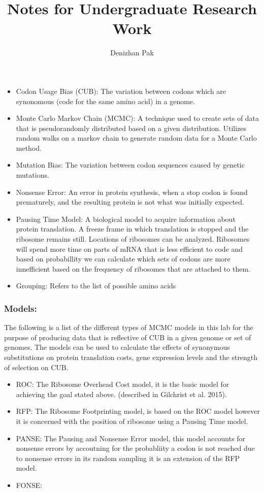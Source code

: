 \documentclass[12pt,hyperref]{labbook}
\title{Notes for Undergraduate Research Work}
\author{Denizhan Pak}
\begin{document}
\maketitle
\newpage
\tableofcontents
\newpage




\begin{itemize} 
	\item Codon Usage Bias (CUB): The variation between codons which are synonomous (code for the same amino acid) in a genome.
	\item Monte Carlo Markov Chain (MCMC): A technique used to create sets of data that is pseudorandomly distributed based on a given distribution. Utilizes random walks on a markov chain to generate random data for a Monte Carlo method.
	\item Mutation Bias: The variation between codon sequences caused by genetic mutations.
	\item Nonsense Error: An error in protein synthesis, when a stop codon is found prematurely, and the resulting protein is not what was initially expected.
	\item Pausing Time Model: A biological model to acquire information about protein translation. A freeze frame in which translation is stopped and the ribosome remains still. Locations of ribosomes can be analyzed. Ribosomes will spend more time on parts of mRNA that is less efficient to code and based on probabillity we can calculate which sets of codons are more innefficient based on the frequency of ribosomes that are attached to them.
    \item Grouping: Refers to the list of possible amino acids
\end{itemize}


\subsubsection{Models:}
The following is a list of the different types of MCMC models in this lab for the purpose of producing data that is reflective of CUB in a given genome or set of genomes. The models can be used to calculate the effects of synonymous substitutions on protein translation costs, gene expression levels and the strength of selection on CUB.
\begin{itemize}
	\item ROC: The Ribosome Overhead Cost model, it is the basic model for achieving the goal stated above. (described in Gilchrist et al. 2015).
	\item RFP: The Ribosome Footprinting model, is based on the ROC model however it is concerned with the position of ribosome using a Pausing Time model.
	\item PANSE: The Pausing and Nonsense Error model, this model accounts for nonsense errors by accoutning for the probabliity a codon is not reached due to nonsense errors in its random sampling it is an extension of the RFP model.
	\item FONSE: 
\end{itemize}
\end{document}
